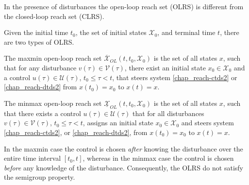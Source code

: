 \documentclass[letterpaper,10pt,english]{sphinxmanual}
\begin{document}
In the presence of disturbances the open-loop reach set (OLRS) is
different from the closed-loop reach set (CLRS).

Given the initial time $t_0$, the set of initial states
${\mathcal X}_0$, and terminal time $t$, there are two types
of OLRS.

The maxmin open-loop reach set
$\overline{{\mathcal X}}_{OL}(t, t_0, {\mathcal X}_0)$ is the set
of all states $x$, such that for any disturbance
$v(\tau)\in{\mathcal V}(\tau)$, there exist an initial state
$x_0\in{\mathcal X}_0$ and a control
$u(\tau)\in{\mathcal U}(\tau)$, $t_0\leqslant\tau<t$, that
steers system \eqref{chap_reach-ctds2} or \eqref{chap_reach-dtds2} from $x(t_0)=x_0$ to
$x(t)=x$.

The minmax open-loop reach set
$\underline{{\mathcal X}}_{OL}(t, t_0, {\mathcal X}_0)$ is the set
of all states $x$, such that there exists a control
$u(\tau)\in{\mathcal U}(\tau)$ that for all disturbances
$v(\tau)\in{\mathcal V}(\tau)$, $t_0\leqslant\tau<t$,
assigns an initial state $x_0\in{\mathcal X}_0$ and steers system
\eqref{chap_reach-ctds2}, or \eqref{chap_reach-dtds2}, from $x(t_0)=x_0$ to $x(t)=x$.

In the maxmin case the control is chosen
\emph{after} knowing the disturbance over the entire time interval
$[t_0, t]$, whereas in the minmax case the control is chosen
\emph{before} any knowledge of the disturbance. Consequently, the OLRS do not
satisfy the semigroup property.
\end{document}
